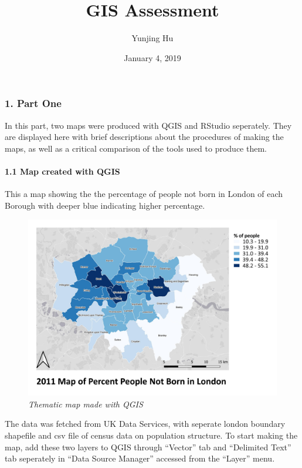 \documentclass[]{article}
\title{GIS Assessment}
\author{Yunjing Hu}
\date{January 4, 2019}
\let\oldparagraph\paragraph
\renewcommand{\paragraph}[1]{\oldparagraph{#1}\mbox{}}
\begin{document}
\maketitle

\subsubsection{1. Part One}\label{part-one}

In this part, two maps were produced with QGIS and RStudio seperately.
They are displayed here with brief descriptions about the procedures of
making the maps, as well as a critical comparison of the tools used to
produce them.

\paragraph{1.1 Map created with QGIS}\label{map-created-with-qgis}

This a map showing the the percentage of people not born in London of
each Borough with deeper blue indicating higher percentage.

\begin{figure}
\centering
\includegraphics{Part1/QGIS_Map.jpg}
\caption{\emph{Thematic map made with QGIS}}
\end{figure}

The data was fetched from UK Data Services, with seperate london
boundary shapefile and csv file of census data on population structure.
To start making the map, add these two layers to QGIS through ``Vector''
tab and ``Delimited Text'' tab seperately in ``Data Source Manager''
accessed from the ``Layer'' menu.
\end{document}
